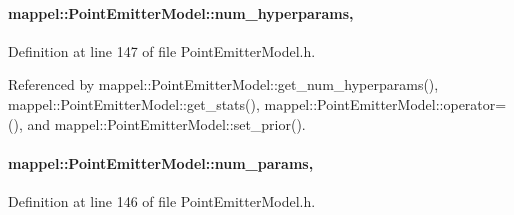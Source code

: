 \paragraph[{\texorpdfstring{num\+\_\+hyperparams}{num_hyperparams}}]{ mappel\+::\+Point\+Emitter\+Model\+::num\+\_\+hyperparams\hspace{0.3cm}{\ttfamily [protected]}, {\ttfamily [inherited]}}\hypertarget{classmappel_1_1PointEmitterModel_ab2423214fdd81c8212118770b5b17b1f}{}\label{classmappel_1_1PointEmitterModel_ab2423214fdd81c8212118770b5b17b1f}


Definition at line 147 of file Point\+Emitter\+Model.\+h.



Referenced by mappel\+::\+Point\+Emitter\+Model\+::get\+\_\+num\+\_\+hyperparams(), mappel\+::\+Point\+Emitter\+Model\+::get\+\_\+stats(), mappel\+::\+Point\+Emitter\+Model\+::operator=(), and mappel\+::\+Point\+Emitter\+Model\+::set\+\_\+prior().

\paragraph[{\texorpdfstring{num\+\_\+params}{num_params}}]{ mappel\+::\+Point\+Emitter\+Model\+::num\+\_\+params\hspace{0.3cm}{\ttfamily [protected]}, {\ttfamily [inherited]}}\hypertarget{classmappel_1_1PointEmitterModel_a9af0484391bd6021ddc04ac666ab49ad}{}\label{classmappel_1_1PointEmitterModel_a9af0484391bd6021ddc04ac666ab49ad}


Definition at line 146 of file Point\+Emitter\+Model.\+h.



